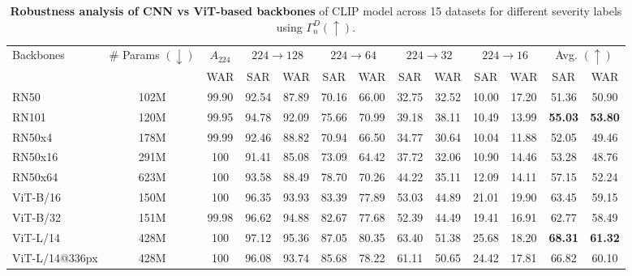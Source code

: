 \begin{table}[!h]
  \caption{\textbf{Robustness analysis of CNN vs ViT-based backbones} of CLIP model across 15 datasets for different severity labels using $\Gamma^{D}_{n} (\uparrow)$.}
  \label{tab:cnn_vs_vit}
  \centering
  \footnotesize
  \setlength\tabcolsep{2pt}
  \begin{tabular}{l|c|c|cc|cc|cc|cc|cc}
    \toprule
    Backbones & \# Params $(\downarrow)$ & $A_{224}$&  
    \multicolumn{2}{c|}{$224\rightarrow128$} & 
    \multicolumn{2}{c|}{$224\rightarrow64$} & 
    \multicolumn{2}{c|}{$224\rightarrow32$} & 
    \multicolumn{2}{c|}{$224\rightarrow16$}
    & \multicolumn{2}{c}{Avg. $(\uparrow)$} \\ 
    & & WAR & SAR & WAR & SAR & WAR & SAR & WAR & SAR & WAR & SAR & WAR\\ 
    \midrule
     RN50 & 102M & 99.90 & 92.54 & 87.89 & 70.16 & 66.00 & 32.75 & 32.52 & 10.00 & 17.20 & 51.36 & 50.90\\
     RN101 & 120M & 99.95 & 94.78 & 92.09 & 75.66 & 70.99 & 39.18 & 38.11 & 10.49 & 13.99 & \textbf{55.03} & \textbf{53.80} \\
     
     \hline 
     RN50x4 & 178M & 99.99 & 92.46 & 88.82 & 70.94 & 66.50 & 34.77 & 30.64 & 10.04 & 11.88 & 52.05 & 49.46 \\  
     \hline 
     
     
     RN50x16 & 291M & 100 & 91.41 & 85.08 & 73.09 & 64.42 & 37.72 & 32.06 & 10.90 & 14.46 & 53.28 & 48.76\\
     RN50x64 & 623M & 100 & 93.58 & 88.49 & 78.70 & 70.26 & 44.22 & 35.11 & 12.09 & 14.11 & 57.15 & 52.24\\
     \midrule
     ViT-B/16 & 150M & 100 & 96.35 & 93.93 & 83.39 & 77.89 & 53.03 & 44.89 & 21.01 & 19.90 & 63.45 & 59.15\\
     ViT-B/32 & 151M & 99.98 & 96.62 & 94.88 & 82.67 & 77.68 & 52.39 & 44.49 & 19.41 & 16.91 & 62.77 & 58.49\\ 
     ViT-L/14 & 428M & 100 & 97.12 & 95.36 & 87.05 & 80.35 & 63.40 & 51.38 & 25.68 & 18.20 & \textbf{68.31} & \textbf{61.32}\\ 
     ViT-L/14@336px & 428M & 100& 96.08 & 93.74 & 85.68 & 78.22 & 61.11 & 50.65 & 24.42 & 17.81 & 66.82 & 60.10\\ 
    \hline
  \bottomrule
  \end{tabular}
\end{table}




